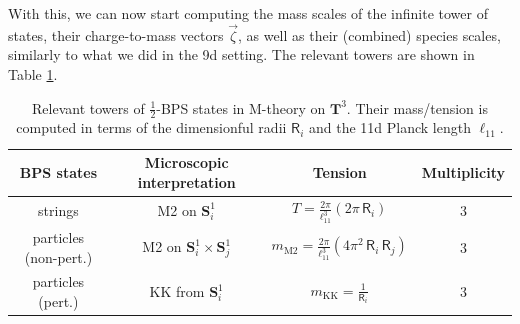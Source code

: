 With this, we can now start computing the mass scales of the infinite tower of states, their charge-to-mass vectors $\vec{\zeta}$, as well as their (combined) species scales, similarly to what we did in the 9d setting. The relevant towers are shown in Table \ref{tab:BPSstates}. 
\begin{table}[tb]\begin{center}
\renewcommand{\arraystretch}{2.00}
\begin{tabular}{|c|c|c|c|}
\hline BPS states & Microscopic interpretation & Tension & Multiplicity \\
\hline \hline 
strings &  M2 on $\mathbf{S}^1_i$  &    $T = \frac{2 \pi}{\ell_{11}^3} (2\pi\, \mathsf{R}_i)$  &   $3$ \\
particles (non-pert.) & M2 on $\mathbf{S}^1_i \times \mathbf{S}^1_j$  &    $m_{\text{M2}} = \frac{2 \pi}{\ell_{11}^3} (4\pi^2\, \mathsf{R}_i\, \mathsf{R}_j)$  &   $3$ \\
particles (pert.) &  KK from $\mathbf{S}^1_i$  &    $m_{\text{KK}}= \frac{1}{\mathsf{R}_i}$  &   $3$\\
\hline
\end{tabular}
\caption{Relevant towers of $\frac{1}{2}$-BPS states in M-theory on $\mathbf{T}^3$. Their mass/tension is computed in terms of the dimensionful radii $\mathsf{R}_i$ and the 11d Planck length $\ell_{11}$.}
  \label{tab:BPSstates}
  \end{center}\end{table} 

 

